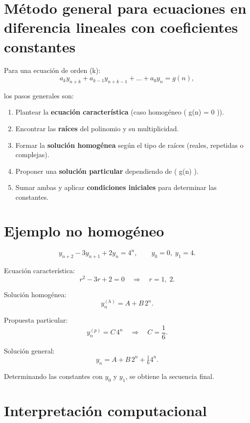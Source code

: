 \documentclass[
  letterpaper,
  DIV=11,
  numbers=noendperiod]{scrreprt}
\providecommand{\tightlist}{%
  \setlength{\itemsep}{0pt}\setlength{\parskip}{0pt}}
\begin{document}
\section{Método general para ecuaciones en diferencia lineales con
coeficientes
constantes}\label{muxe9todo-general-para-ecuaciones-en-diferencia-lineales-con-coeficientes-constantes}

Para una ecuación de orden (k): \[
a_k y_{n+k} + a_{k-1} y_{n+k-1} + \dots + a_0 y_n = g(n),
\]

los pasos generales son:

\begin{enumerate}
\def\labelenumi{\arabic{enumi}.}
\tightlist
\item
  Plantear la \textbf{ecuación característica} (caso homogéneo ( g(n) =
  0 )).\\
\item
  Encontrar las \textbf{raíces} del polinomio y su multiplicidad.\\
\item
  Formar la \textbf{solución homogénea} según el tipo de raíces (reales,
  repetidas o complejas).\\
\item
  Proponer una \textbf{solución particular} dependiendo de ( g(n) ).\\
\item
  Sumar ambas y aplicar \textbf{condiciones iniciales} para determinar
  las constantes.
\end{enumerate}

\section{Ejemplo no homogéneo}\label{ejemplo-no-homoguxe9neo}

\[
y_{n+2} - 3y_{n+1} + 2y_n = 4^n, 
\qquad 
y_0 = 0,\; y_1 = 4.
\]

Ecuación característica: \[
r^2 - 3r + 2 = 0 
\quad \Rightarrow \quad 
r = 1,\; 2.
\]

Solución homogénea: \[
y_n^{(h)} = A + B\,2^n.
\]

Propuesta particular: \[
y_n^{(p)} = C\,4^n \quad \Rightarrow \quad C = \frac{1}{6}.
\]

Solución general: \[
y_n = A + B\,2^n + \tfrac{1}{6}4^n.
\]

Determinando las constantes con \(y_0\) y \(y_1\), se obtiene la
secuencia final.

\section{Interpretación
computacional}\label{interpretaciuxf3n-computacional}
\end{document}
